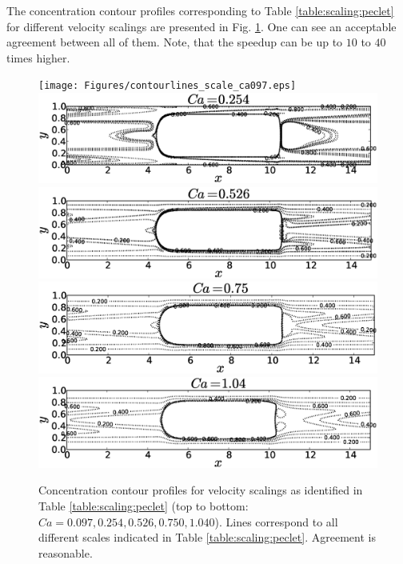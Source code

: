 \documentclass{article}
\begin{document}
The concentration contour profiles corresponding to Table \ref{table:scaling:peclet} for different
velocity scalings are presented in Fig. \ref{fig:contours:scaling:peclet}. One can see an
acceptable agreement between all of them. Note, that the speedup can be up to $10$ to $40$ times
higher.
\begin{figure}[htb!]
\texttt{[image: Figures/contourlines\_scale\_ca097.eps]}\\
\includegraphics[height=0.25\textwidth]{Figures/contourlines_scale_ca054.eps}\\
\includegraphics[height=0.25\textwidth]{Figures/contourlines_scale_ca026.eps}\\
\includegraphics[height=0.25\textwidth]{Figures/contourlines_scale_ca05.eps}\\
\includegraphics[height=0.25\textwidth]{Figures/contourlines_scale_ca14.eps}\\
\caption{Concentration contour profiles for velocity scalings as identified in Table
\ref{table:scaling:peclet} (top to bottom:
$Ca=0.097,0.254,0.526,0.750,1.040$). Lines correspond to
all different scales indicated in Table
\ref{table:scaling:peclet}. Agreement is reasonable. \label{fig:contours:scaling:peclet}}
\end{figure}
\end{document}
